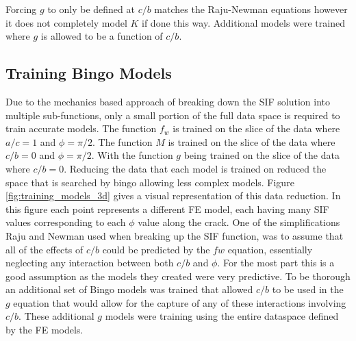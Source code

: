 Forcing $g$ to only be defined at $c/b$ matches the Raju-Newman equations however it does not completely model $K$ if done this way. Additional models were trained where $g$ is allowed to be a function of $c/b$. 



\subsection{Training Bingo Models}

Due to the mechanics based approach of breaking down the SIF solution into multiple sub-functions, only a small portion of the full data space is required to train accurate models. The function $f_w$ is trained on the slice of the data where $a/c = 1$ and $\phi = \pi/2$. The function $M$ is trained on the slice of the data where $c/b = 0$ and $\phi = \pi/2$. With the function $g$ being trained on the slice of the data where $c/b = 0$. Reducing the data that each model is trained on reduced the space that is searched by bingo allowing less complex models. Figure \ref{fig:training_models_3d} gives a visual representation of this data reduction. In this figure each point represents a different FE model, each having many SIF values corresponding to each $\phi$ value along the crack. One of the simplifications Raju and Newman used when breaking up the SIF function, was to assume that all of the effects of $c/b$ could be predicted by the $fw$ equation, essentially neglecting any interaction between both $c/b$ and $\phi$. For the most part this is a good assumption as the models they created were very predictive. To be thorough an  additional set of Bingo models was trained that allowed $c/b$ to be used in the $g$ equation that would allow for the capture of any of these interactions involving $c/b$. These additional $g$ models were training using the entire dataspace defined by the FE models.

